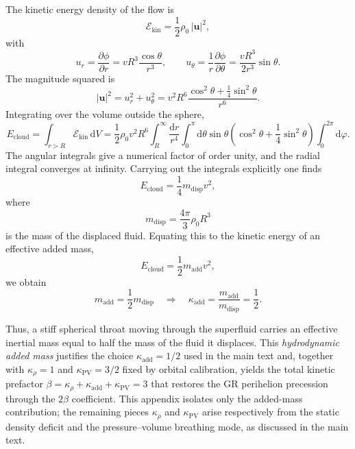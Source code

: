 \documentclass[11pt]{article}
\begin{document}
The kinetic energy density of the flow is
\begin{equation}
  \mathcal{E}_{\mathrm{kin}} = \frac{1}{2}\rho_0\,|\mathbf{u}|^2,
\end{equation}
with
\begin{equation}
  u_r = \frac{\partial\phi}{\partial r}
      = v R^3 \frac{\cos\theta}{r^3},
  \qquad
  u_\theta = \frac{1}{r}\frac{\partial\phi}{\partial\theta}
      = \frac{v R^3}{2 r^3}\sin\theta.
\end{equation}
The magnitude squared is
\begin{equation}
  |\mathbf{u}|^2
  = u_r^2 + u_\theta^2
  = v^2 R^6 \frac{\cos^2\theta + \tfrac{1}{4}\sin^2\theta}{r^6}.
\end{equation}
Integrating over the volume outside the sphere,
\begin{equation}
  E_{\mathrm{cloud}}
  = \int_{r>R} \mathcal{E}_{\mathrm{kin}}\,\mathrm{d}V
  = \frac{1}{2}\rho_0 v^2 R^6
    \int_R^\infty \frac{\mathrm{d}r}{r^4}
    \int_0^\pi \mathrm{d}\theta \sin\theta
      \left(\cos^2\theta + \frac{1}{4}\sin^2\theta\right)
    \int_0^{2\pi}\mathrm{d}\varphi.
\end{equation}
The angular integrals give a numerical factor of order unity, and the radial
integral converges at infinity.
Carrying out the integrals explicitly one finds
\begin{equation}
  E_{\mathrm{cloud}}
  = \frac{1}{4} m_{\mathrm{disp}} v^2,
\end{equation}
where
\begin{equation}
  m_{\mathrm{disp}} = \frac{4\pi}{3}\rho_0 R^3
\end{equation}
is the mass of the displaced fluid.
Equating this to the kinetic energy of an effective added mass,
\begin{equation}
  E_{\mathrm{cloud}} = \frac{1}{2} m_{\mathrm{add}} v^2,
\end{equation}
we obtain
\begin{equation}
  m_{\mathrm{add}} = \frac{1}{2} m_{\mathrm{disp}}
  \quad\Rightarrow\quad
  \kappa_{\mathrm{add}} = \frac{m_{\mathrm{add}}}{m_{\mathrm{disp}}}
  = \frac{1}{2}.
\end{equation}

Thus, a stiff spherical throat moving through the superfluid carries an
effective inertial mass equal to half the mass of the fluid it displaces.
This \emph{hydrodynamic added mass} justifies the choice
$\kappa_{\mathrm{add}} = 1/2$ used in the main text and, together with
$\kappa_\rho = 1$ and $\kappa_{\mathrm{PV}} = 3/2$ fixed by orbital calibration, yields the total kinetic
prefactor
$\beta = \kappa_\rho + \kappa_{\mathrm{add}} + \kappa_{\mathrm{PV}} = 3$
that restores the GR perihelion precession through the $2\beta$ coefficient.
This appendix isolates only the added-mass contribution; the remaining pieces
$\kappa_\rho$ and $\kappa_{\mathrm{PV}}$ arise respectively from the static
density deficit and the pressure--volume breathing mode, as discussed in the
main text.
\end{document}
